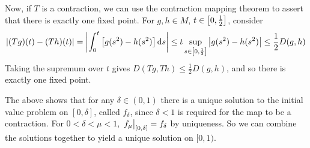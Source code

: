 Now, if \( T \) is a contraction, we can use the contraction mapping theorem to assert that there is exactly one fixed point.
For \( g,h \in M \), \( t \in \qty[0, \frac{1}{2}] \), consider
\[
	\abs{(Tg)(t) - (Th)(t)} = \abs{\int_0^t \qty[g(s^2) - h(s^2)] \dd{s}} \leq t \sup_{s \in \qty[0, \frac{1}{2}]} \abs{g(s^2) - h(s^2)} \leq \frac{1}{2} D(g,h)
\]
Taking the supremum over \( t \) gives \( D(Tg, Th) \leq \frac{1}{2} D(g,h) \), and so there is exactly one fixed point.
\begin{remark}
	The above shows that for any \( \delta \in (0, 1) \) there is a unique solution to the initial value problem on \( [0, \delta] \), called \( f_\delta \), since \( \delta < 1 \) is required for the map to be a contraction.
	For \( 0 < \delta < \mu < 1 \), \( \eval{f_\mu}_{[0,\delta]} = f_\delta \) by uniqueness.
	So we can combine the solutions together to yield a unique solution on \( [0,1) \).
\end{remark}
